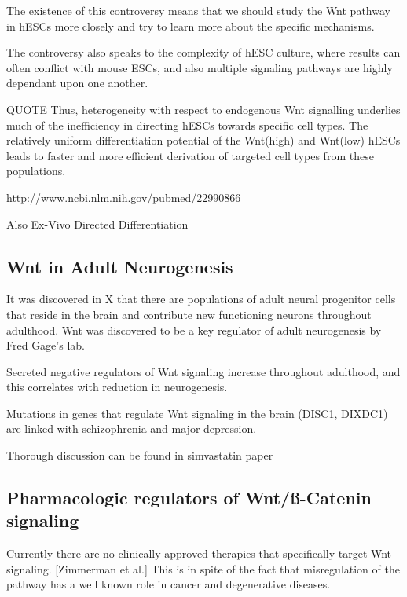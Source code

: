 The existence of this controversy means that we should study the Wnt pathway in hESCs more closely and try to learn more about the specific mechanisms.

The controversy also speaks to the complexity of hESC culture, where results can often conflict with mouse ESCs, and also multiple signaling pathways are highly dependant upon one another.

QUOTE Thus, heterogeneity with respect to endogenous Wnt signalling underlies much of the inefficiency in directing hESCs towards specific cell types. The relatively uniform differentiation potential of the Wnt(high) and Wnt(low) hESCs leads to faster and more efficient derivation of targeted cell types from these populations.

http://www.ncbi.nlm.nih.gov/pubmed/22990866

Also Ex-Vivo Directed Differentiation


\subsection{Wnt in Adult Neurogenesis}

It was discovered in X that there are populations of adult neural progenitor cells that reside in the brain and contribute new functioning neurons throughout adulthood. Wnt was discovered to be a key regulator of adult neurogenesis by Fred Gage's lab.

Secreted negative regulators of Wnt signaling increase throughout adulthood, and this correlates with reduction in neurogenesis.

Mutations in genes that regulate  Wnt signaling in the brain (DISC1, DIXDC1) are linked with schizophrenia and major depression.

Thorough discussion can be found in simvastatin paper


\subsection{Pharmacologic regulators of Wnt/ß-Catenin signaling}

Currently there are no clinically approved therapies that specifically target Wnt signaling. [Zimmerman et al.] This is in spite of the fact that misregulation of the pathway has a well known role in cancer and degenerative diseases. 

